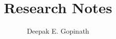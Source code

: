 \documentclass[]{article}
\title{Research Notes}
\author{Deepak E. Gopinath}
\begin{document}
\date{}
\maketitle

%
%
%
%
%
%
%
%
\end{document}
